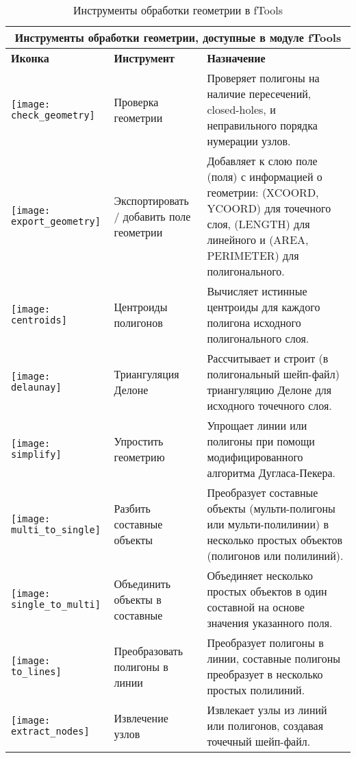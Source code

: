 \begin{table}[ht]
\centering
\begin{tabular}{|m{1cm}|m{3cm}|m{9cm}|}
 \hline \multicolumn{3}{|c|}{\textbf{Инструменты обработки геометрии, доступные в  модуле fTools}} \\
 \hline \textbf{Иконка} & \textbf{Инструмент} & \textbf{Назначение} \\
 \hline \texttt{[image: check\_geometry]} & Проверка геометрии &
 Проверяет полигоны на наличие пересечений, closed-holes, и неправильного порядка нумерации узлов. \\
 \hline \texttt{[image: export\_geometry]} & Экспортировать / добавить поле
 геометрии & Добавляет к слою поле (поля) с информацией о геометрии: (XCOORD, YCOORD) для точечного
 слоя, (LENGTH) для линейного и (AREA, PERIMETER) для полигонального. \\
 \hline \texttt{[image: centroids]} & Центроиды полигонов &
 Вычисляет истинные центроиды для каждого полигона исходного полигонального слоя. \\
 \hline \texttt{[image: delaunay]} & Триангуляция Делоне &
 Рассчитывает и строит (в полигональный шейп-файл) триангуляцию Делоне для исходного точечного слоя. \\
 \hline \texttt{[image: simplify]} & Упростить геометрию &
 Упрощает линии или полигоны при помощи модифицированного алгоритма Дугласа-Пекера. \\
 \hline \texttt{[image: multi\_to\_single]} & Разбить составные
 объекты & Преобразует составные объекты (мульти-полигоны или мульти-полилинии)
 в несколько простых объектов (полигонов или полилиний). \\
 \hline \texttt{[image: single\_to\_multi]} & Объединить
 объекты в составные & Объединяет несколько простых объектов в один составной
 на основе значения указанного поля. \\
 \hline \texttt{[image: to\_lines]} & Преобразовать полигоны в линии
 & Преобразует полигоны в линии, составные полигоны преобразует в несколько простых полилиний. \\
 \hline \texttt{[image: extract\_nodes]} & Извлечение узлов &
 Извлекает узлы из линий или полигонов, создавая точечный шейп-файл. \\
 \hline
\end{tabular}
\caption{Инструменты обработки геометрии в fTools}\label{tab:ftool_geometry}
\end{table}

